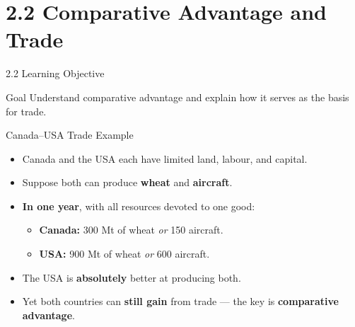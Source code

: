 \documentclass[aspectratio=169]{beamer}
\begin{document}
\section{2.2 Comparative Advantage and Trade}

\begin{frame}{2.2 Learning Objective}
\transfade
\begin{block}{Goal}
Understand comparative advantage and explain how it serves as the basis for trade.
\end{block}
\end{frame}

\begin{frame}{Canada--USA Trade Example}
\transfade
\begin{itemize}[<+->]
  \item Canada and the USA each have limited land, labour, and capital.
  \item Suppose both can produce \textbf{wheat} and \textbf{aircraft}.
  \item \textbf{In one year}, with all resources devoted to one good:
  \begin{itemize}[<+->]
    \item \textbf{Canada:} 300 Mt of wheat \emph{or} 150 aircraft.
    \item \textbf{USA:} 900 Mt of wheat \emph{or} 600 aircraft.
  \end{itemize}
  \item The USA is \textbf{absolutely} better at producing both.
  \item Yet both countries can \textbf{still gain} from trade --- the key is \textbf{comparative advantage}.
\end{itemize}
\end{frame}
\end{document}
